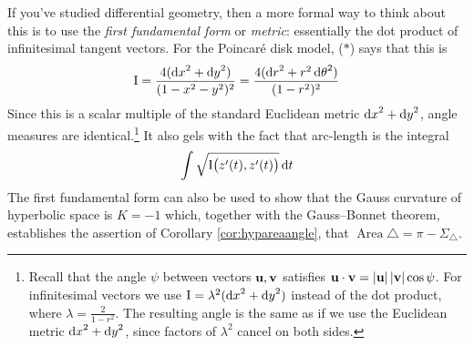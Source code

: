 If you've studied differential geometry, then a more formal way to think about this is to use the \emph{first fundamental form} or \emph{metric}: essentially the dot product of infinitesimal tangent vectors. For the Poincaré disk model, ($\ast$) says that this is
\[
	\mathrm{I} =\frac{4({\mathrm{d} x}^2+{\mathrm{d} y}^2)}{(1-x^2-y^2)^2} =\frac{4({\mathrm{d} r}^2+r^2\,{\mathrm{d}\theta}^2)}{(1-r^2)^2} 
\]
Since this is a scalar multiple of the standard Euclidean metric ${\mathrm{d} x}^2+{\mathrm{d} y}^2$, angle measures are identical.\footnote{%
	Recall that the angle $\psi$ between vectors ${\mathbf{u}},{\mathbf{v}}$ satisfies ${\mathbf{u}}\cdot{\mathbf{v}}=\left| {\mathbf{u}}\right|\left| {\mathbf{v}}\right|\cos\psi$. For infinitesimal vectors we use $\mathrm{I}=\lambda^2({\mathrm{d} x}^2+{\mathrm{d} y}^2)$ instead of the dot product, where $\lambda=\frac 2{1-r^2}$. The resulting angle is the same as if we use the Euclidean metric ${\mathrm{d} x}^2+{\mathrm{d} y}^2$, since factors of $\lambda^2$ cancel on both sides.
}
It also gels with the fact that arc-length is the integral
\[
	\int\sqrt{\mathrm{I}\bigl(z'(t),z'(t)\bigr)}\,{\mathrm{d} t}
\]
The first fundamental form can also be used to show that the Gauss curvature of hyperbolic space is $K=-1$ which, together with the Gauss--Bonnet theorem, establishes the assertion of Corollary \ref{cor:hypareaangle}, that $\operatorname{Area}\triangle =\pi-\Sigma_{\triangle}$.

